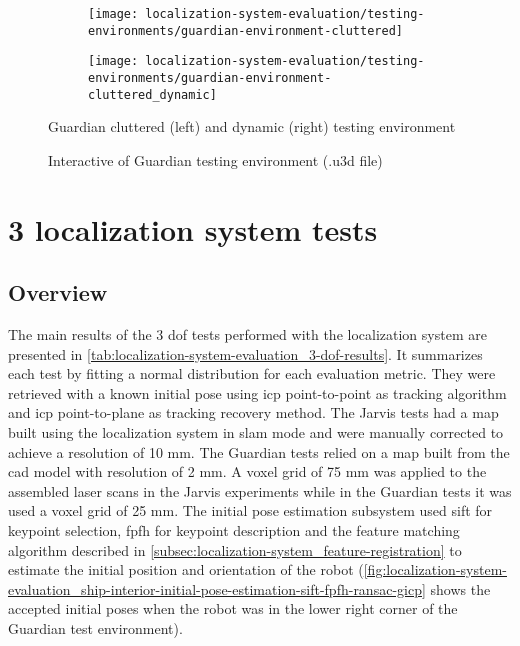 \begin{figure}[H]
	\centering
	\begin{subfigure}[h]{.497\textwidth}
		\centering
		\texttt{[image: localization-system-evaluation/testing-environments/guardian-environment-cluttered]}
	\end{subfigure}
	\begin{subfigure}[h]{.497\textwidth}
		\centering
		\texttt{[image: localization-system-evaluation/testing-environments/guardian-environment-cluttered\_dynamic]}
	\end{subfigure}
	\caption{Guardian cluttered (left) and dynamic (right) testing environment}
	\label{fig:localization-system-evaluation_guardian-tests-environment-cluttered}
\end{figure}

\begin{figure}[H]
	\centering
	\caption{Interactive  of Guardian testing environment (.u3d file)}
	\label{fig:localization-system-evaluation_guardian-tests-environment-interactive}
\end{figure}



\section{3  localization system tests}


\subsection{Overview}

The main results of the 3 \gls{dof} tests performed with the localization system are presented in \cref{tab:localization-system-evaluation_3-dof-results}. It summarizes each test by fitting a normal distribution for each evaluation metric. They were retrieved with a known initial pose using \gls{icp} point-to-point as tracking algorithm and \gls{icp} point-to-plane as tracking recovery method. The Jarvis tests had a map built using the localization system in \gls{slam} mode and were manually corrected to achieve a resolution of 10 mm. The Guardian tests relied on a map built from the \gls{cad} model with resolution of 2 mm. A voxel grid of 75 mm was applied to the assembled laser scans in the Jarvis experiments while in the Guardian tests it was used a voxel grid of 25 mm. The initial pose estimation subsystem used \gls{sift} for keypoint selection, \gls{fpfh} for keypoint description and the feature matching algorithm described in \cref{subsec:localization-system_feature-registration} to estimate the initial position and orientation of the robot (\cref{fig:localization-system-evaluation_ship-interior-initial-pose-estimation-sift-fpfh-ransac-gicp} shows the accepted initial poses when the robot was in the lower right corner of the Guardian test environment).

